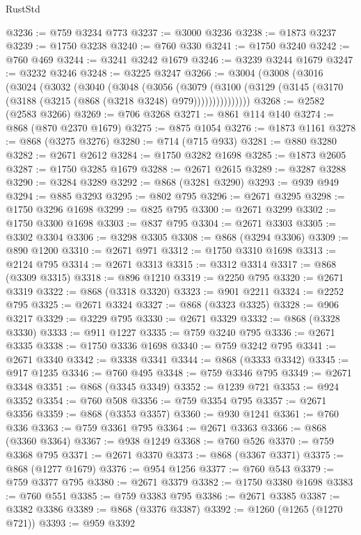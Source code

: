 \begin{lexlean}{RustStd}
\begin{coremodule}
@3236 := @759 @3234 @773
@3237 := @3000 @3236
@3238 := @1873 @3237
@3239 := @1750 @3238
@3240 := @760 @330
@3241 := @1750 @3240
@3242 := @760 @469
@3244 := @3241 @3242 @1679
@3246 := @3239 @3244 @1679
@3247 := @3232 @3246
@3248 := @3225 @3247
@3266 := @3004
    (@3008
      (@3016
        (@3024
          (@3032
            (@3040
              (@3048
                (@3056
                  (@3079
                    (@3100
                      (@3129 (@3145 (@3170 (@3188 (@3215 (@868 (@3218 @3248) @979)))))))))))))))
@3268 := @2582 (@2583 @3266)
@3269 := @706 @3268
@3271 := @861 @114 @140
@3274 := @868 (@870 @2370 @1679)
@3275 := @875 @1054
@3276 := @1873 @1161
@3278 := @868 (@3275 @3276)
@3280 := @714 (@715 @933)
@3281 := @880 @3280
@3282 := @2671 @2612
@3284 := @1750 @3282 @1698
@3285 := @1873 @2605
@3287 := @1750 @3285 @1679
@3288 := @2671 @2615
@3289 := @3287 @3288
@3290 := @3284 @3289
@3292 := @868 (@3281 @3290)
@3293 := @939 @949
@3294 := @885 @3293
@3295 := @802 @795
@3296 := @2671 @3295
@3298 := @1750 @3296 @1698
@3299 := @825 @795
@3300 := @2671 @3299
@3302 := @1750 @3300 @1698
@3303 := @837 @795
@3304 := @2671 @3303
@3305 := @3302 @3304
@3306 := @3298 @3305
@3308 := @868 (@3294 @3306)
@3309 := @890 @1200
@3310 := @2671 @971
@3312 := @1750 @3310 @1698
@3313 := @2124 @795
@3314 := @2671 @3313
@3315 := @3312 @3314
@3317 := @868 (@3309 @3315)
@3318 := @896 @1210
@3319 := @2250 @795
@3320 := @2671 @3319
@3322 := @868 (@3318 @3320)
@3323 := @901 @2211
@3324 := @2252 @795
@3325 := @2671 @3324
@3327 := @868 (@3323 @3325)
@3328 := @906 @3217
@3329 := @3229 @795
@3330 := @2671 @3329
@3332 := @868 (@3328 @3330)
@3333 := @911 @1227
@3335 := @759 @3240 @795
@3336 := @2671 @3335
@3338 := @1750 @3336 @1698
@3340 := @759 @3242 @795
@3341 := @2671 @3340
@3342 := @3338 @3341
@3344 := @868 (@3333 @3342)
@3345 := @917 @1235
@3346 := @760 @495
@3348 := @759 @3346 @795
@3349 := @2671 @3348
@3351 := @868 (@3345 @3349)
@3352 := @1239 @721
@3353 := @924 @3352
@3354 := @760 @508
@3356 := @759 @3354 @795
@3357 := @2671 @3356
@3359 := @868 (@3353 @3357)
@3360 := @930 @1241
@3361 := @760 @336
@3363 := @759 @3361 @795
@3364 := @2671 @3363
@3366 := @868 (@3360 @3364)
@3367 := @938 @1249
@3368 := @760 @526
@3370 := @759 @3368 @795
@3371 := @2671 @3370
@3373 := @868 (@3367 @3371)
@3375 := @868 (@1277 @1679)
@3376 := @954 @1256
@3377 := @760 @543
@3379 := @759 @3377 @795
@3380 := @2671 @3379
@3382 := @1750 @3380 @1698
@3383 := @760 @551
@3385 := @759 @3383 @795
@3386 := @2671 @3385
@3387 := @3382 @3386
@3389 := @868 (@3376 @3387)
@3392 := @1260 (@1265 (@1270 @721))
@3393 := @959 @3392

\end{coremodule}
\end{lexlean}
